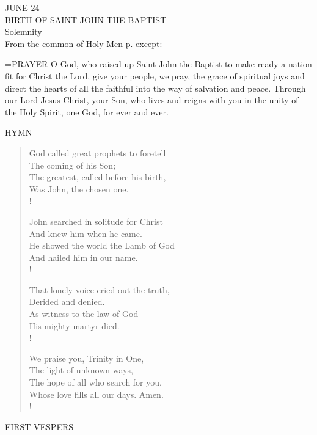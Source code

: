 \begin{center}\normalsize JUNE 24\\
\footnotesize BIRTH OF SAINT JOHN THE BAPTIST\\
\footnotesize Solemnity\\
\footnotesize From the common of Holy Men p.     except:\\
\end{center}

\hangindent=\parindent \small{PRAYER 
O God, who raised up Saint John the Baptist
to make ready a nation fit for Christ the Lord,
give your people, we pray,
the grace of spiritual joys
and direct the hearts of all the faithful
into the way of salvation and peace.
Through our Lord Jesus Christ, your Son,
who lives and reigns with you in the unity of the Holy Spirit,
one God, for ever and ever.\\}
 
\noindent\small{\uppercase{Hymn}}\normalsize\label{proper:johnthebaptist:hymn}
\begin{verse}
God called great prophets to foretell\\
The coming of his Son;\\
The greatest, called before his birth,\\
Was John, the chosen one.\\!

John searched in solitude for Christ\\
And knew him when he came.\\
He showed the world the Lamb of God\\
And hailed him in our name.\\!

That lonely voice cried out the truth,\\
Derided and denied.\\
As witness to the law of God\\
His mighty martyr died.\\!

We praise you, Trinity in One,\\
The light of unknown ways,\\
The hope of all who search for you,\\
Whose love fills all our days. Amen.\\!
\end{verse}

\begin{flushleft}\normalsize FIRST VESPERS\\\end{flushleft}

